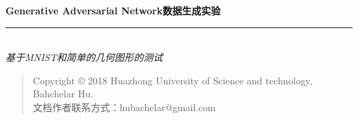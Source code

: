 \thispagestyle{empty}

\noindent\begin{minipage}{\textwidth}
\raggedleft
{\huge \bfseries  Generative Adversarial Network数据生成实验}
\noindent\rule[-1ex]{\textwidth}{5pt}\\[2.5ex]
\hfill\emph{\Large 基于MNIST和简单的几何图形的测试}
\end{minipage}

\noindent{}


\begin{quote}\footnotesize
    Copyright \copyright{}  2018  Huazhong University of Science and technology,
    Bahchelar Hu.\\
    文档作者联系方式：hubachelar@gmail.com
\end{quote}
